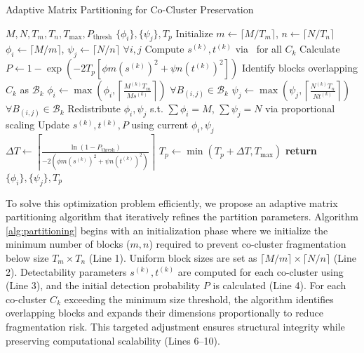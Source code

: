 \documentclass[journal]{IEEEtran}
\begin{document}
\begin{algorithm}[!t]
    \caption{Adaptive Matrix Partitioning for Co-Cluster Preservation}
    \begin{algorithmic}[1]
        \REQUIRE $M, N, T_m, T_n, T_{\text{max}}, P_{\text{thresh}}$
        \ENSURE $\{\phi_i\}, \{\psi_j\}, T_p$
        \STATE Initialize $m \gets \lceil M / T_m \rceil$, $n \gets \lceil N / T_n \rceil$ 
        \STATE $\phi_i \gets \lceil M/m \rceil$, $\psi_j \gets \lceil N/n \rceil$ $\forall i,j$ 
        \STATE Compute $s^{(k)}, t^{(k)}$ via~ for all $C_k$
        \STATE Calculate $P \gets 1 - \exp\left( -2 T_p \left[ \phi m (s^{(k)})^2 + \psi n (t^{(k)})^2 \right] \right)$
        \STATE Identify blocks overlapping $C_k$ as $\mathcal{B}_k$
        \STATE $\phi_i \gets \max\left( \phi_i, \left\lceil \frac{M^{(k)} T_m}{M s^{(k)}} \right\rceil \right)$ $\forall B_{(i,j)} \in \mathcal{B}_k$
        \STATE $\psi_j \gets \max\left( \psi_j, \left\lceil \frac{N^{(k)} T_n}{N t^{(k)}} \right\rceil \right)$ $\forall B_{(i,j)} \in \mathcal{B}_k$
        \ENDFOR
        \STATE Redistribute $\phi_i, \psi_j$ s.t. $\sum \phi_i = M$, $\sum \psi_j = N$ via proportional scaling
        \STATE Update $s^{(k)}, t^{(k)}, P$ using current $\phi_i, \psi_j$
        \STATE $\Delta T \gets \left\lceil \frac{\ln(1 - P_{\text{thresh}})}{-2 \left( \phi m (s^{(k)})^2 + \psi n (t^{(k)})^2 \right)} \right\rceil$
        \STATE $T_p \gets \min(T_p + \Delta T, T_{\text{max}})$
        \ENDIF
        \ENDWHILE
        \STATE \textbf{return} $\{\phi_i\}, \{\psi_j\}, T_p$
    \end{algorithmic}
    \label{alg:partitioning}
\end{algorithm}

To solve this optimization problem efficiently, we propose an adaptive matrix partitioning algorithm that iteratively refines the partition parameters. Algorithm \ref{alg:partitioning} begins with an initialization phase where we initialize the minimum number of blocks ($m,n$) required to prevent co-cluster fragmentation below size $T_m \times T_n$ (Line 1). Uniform block sizes are set as $\lceil M/m \rceil \times \lceil N/n \rceil$ (Line 2). Detectability parameters $s^{(k)}, t^{(k)}$ are computed for each co-cluster using~ (Line 3), and the initial detection probability $P$ is calculated (Line 4).
    {\color{blue}For each co-cluster $C_k$ exceeding the minimum size threshold, the algorithm identifies overlapping blocks and expands their dimensions proportionally to reduce fragmentation risk. This targeted adjustment ensures structural integrity while preserving computational scalability (Lines 6--10).}
\end{document}
